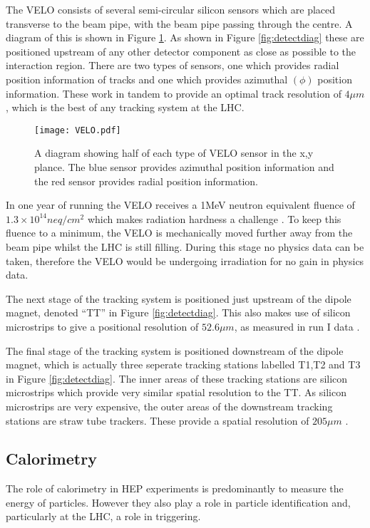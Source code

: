The VELO consists of several semi-circular silicon sensors which are placed transverse to the beam pipe, with the beam pipe passing through the centre.  A diagram of this is shown in Figure \ref{fig:VELO}.  As shown in Figure \ref{fig:detectdiag} these are positioned upstream of any other detector component as close as possible to the interaction region.  There are two types of sensors, one which provides radial position information of tracks and one which provides azimuthal $(\phi)$ position information.  These work in tandem to provide an optimal track resolution of $4\mu m$ \cite{Aaij:1978280}, which is the best of any tracking system at the LHC.
\begin{figure}
  \centering
  \texttt{[image: VELO.pdf]}
  \caption{A diagram showing half of each type of VELO sensor in the x,y plance.  The blue sensor provides azimuthal position information and the red sensor provides radial position information.}
  \label{fig:VELO}
\end{figure}

 In one year of running the VELO receives a 1MeV neutron equivalent fluence of $1.3\times10^{14} neq/cm^2$ which makes radiation hardness a challenge \cite{Alves:1129809}.  To keep this fluence to a minimum, the VELO is mechanically moved further away from the beam pipe whilst the LHC is still filling.  During this stage no physics data can be taken, therefore the VELO would be undergoing irradiation for no gain in physics data.

 The next stage of the \lhcb tracking system is positioned just upstream of the dipole magnet, denoted ``TT'' in Figure \ref{fig:detectdiag}.  This also makes use of silicon microstrips to give a positional resolution of $52.6 \mu m$, as measured in run I data \cite{Aaij:1978280}.

The final stage of the tracking system is positioned downstream of the dipole magnet, which is actually three seperate tracking stations labelled T1,T2 and T3 in Figure \ref{fig:detectdiag}.  The inner areas of these tracking stations are silicon microstrips which provide very similar spatial resolution to the TT.  As silicon microstrips are very expensive, the outer areas of the downstream tracking stations are straw tube trackers.  These provide a spatial resolution of $205 \mu m$ \cite{Aaij:1978280}.

 
\subsection{Calorimetry}
\label{sec:Calorimetry}
The role of calorimetry in HEP experiments is predominantly to measure the energy of particles.  However they also play a role in particle identification and, particularly at the LHC, a role in triggering.

